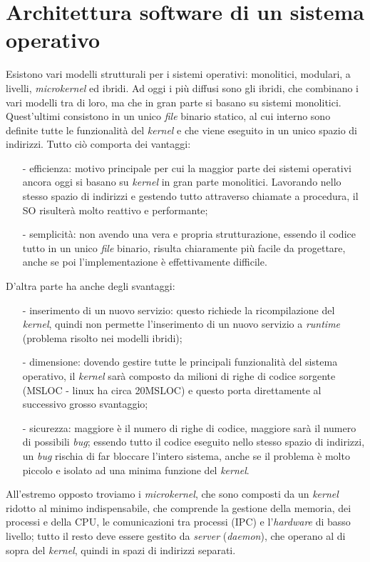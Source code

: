 \section{Architettura software di un sistema operativo}
Esistono vari modelli strutturali per i sistemi operativi: monolitici, modulari, a livelli, \textit{microkernel} ed ibridi. Ad oggi i più diffusi sono gli ibridi, che combinano i vari modelli tra di loro, ma che in gran parte si basano su sistemi monolitici. Quest'ultimi consistono in un unico \textit{file} binario statico, al cui interno sono definite tutte le funzionalità del \textit{kernel} e che viene eseguito in un unico spazio di indirizzi. Tutto ciò comporta dei vantaggi: 
\begin{itemize}
	\item[-] efficienza: motivo principale per cui la maggior parte dei sistemi operativi ancora oggi si basano su \textit{kernel} in gran parte monolitici. Lavorando nello stesso spazio di indirizzi e gestendo tutto attraverso chiamate a procedura, il SO risulterà molto reattivo e performante;
	\item[-] semplicità: non avendo una vera e  propria strutturazione, essendo il codice tutto in un unico \textit{file} binario, risulta chiaramente più facile da progettare, anche se poi l'implementazione è effettivamente difficile.
\end{itemize} 
D'altra parte ha anche degli svantaggi: 
\begin{itemize}
	\item[-] inserimento di un nuovo servizio: questo richiede la ricompilazione del \textit{kernel}, quindi non permette l'inserimento di un nuovo servizio a \textit{runtime} (problema risolto nei modelli ibridi);
	\item[-] dimensione: dovendo gestire tutte le principali funzionalità del sistema operativo, il \textit{kernel} sarà composto da milioni di righe di codice sorgente (MSLOC - linux ha circa 20MSLOC) e questo porta direttamente al successivo grosso svantaggio;
	\item[-] sicurezza: maggiore è il numero di righe di codice, maggiore sarà il numero di possibili \textit{bug}; essendo tutto il codice eseguito nello stesso spazio di indirizzi, un \textit{bug} rischia di far bloccare l'intero sistema, anche se il problema è molto piccolo e isolato ad una minima funzione del \textit{kernel}.
\end{itemize}

All'estremo opposto troviamo i \textit{microkernel}, che sono composti da un \textit{kernel} ridotto al minimo indispensabile, che comprende la gestione della memoria, dei processi e della CPU, le comunicazioni tra processi (IPC) e l'\textit{hardware} di basso livello; tutto il resto deve essere gestito da \textit{server} (\textit{daemon}), che operano al di sopra del \textit{kernel}, quindi in spazi di indirizzi separati.


